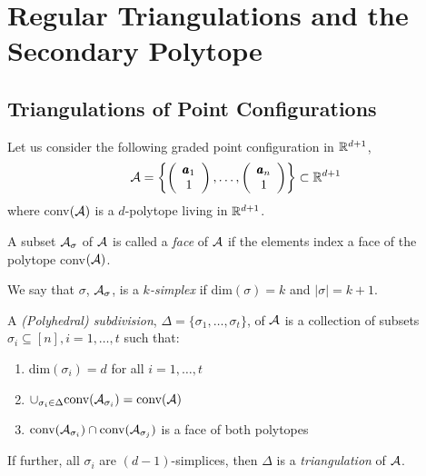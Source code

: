 \section{Regular Triangulations and the Secondary Polytope}

\subsection{Triangulations of Point Configurations}

Let us consider the following graded point configuration in $\mathbb{R}^{d + 1}$,
$$\mathcal{A} = \left\{ \left( \begin{array}{c} \pmb{a}_1 \\ 1 \end{array} \right), \dots, \left( \begin{array}{c} \pmb{a}_n \\ 1 \end{array} \right) \right\} \subset \mathbb{R}^{d+1}$$
where conv$(\mathcal{A})$ is a $d$-polytope living in $\mathbb{R}^{d+1}$.

\begin{definition}
    A subset $\mathcal{A}_{\sigma}$ of $\mathcal{A}$ is called a \textit{face} of $\mathcal{A}$ if the elements index a face of the polytope conv$(\mathcal{A})$.
\end{definition}

\begin{definition}[$k$-simplex]
    We say that $\sigma$, $\mathcal{A}_{\sigma}$, is a \textit{$k$-simplex} if dim$(\sigma) = k$ and $|\sigma| = k + 1$.
\end{definition}

\begin{definition}
    A \textit{(Polyhedral) subdivision}, $\Delta = \{\sigma_1, \dots, \sigma_t \}$, of $\mathcal{A}$ is a collection of subsets $\sigma_i \subseteq [n], i =1, \dots, t$ such that:
    \begin{enumerate}
        \item dim$(\sigma_i) = d$ for all $i = 1, \dots, t$
        \item $\cup_{\sigma_i \in \Delta} \text{conv}(\mathcal{A}_{\sigma_i}) = \text{conv}(\mathcal{A})$
        \item $\text{conv}(\mathcal{A}_{\sigma_i}) \cap \text{conv}(\mathcal{A}_{\sigma_j})$ is a face of both polytopes
    \end{enumerate}
    If further, all $\sigma_i$ are $(d-1)$-simplices, then $\Delta$ is a \textit{triangulation} of $\mathcal{A}$.
\end{definition}

